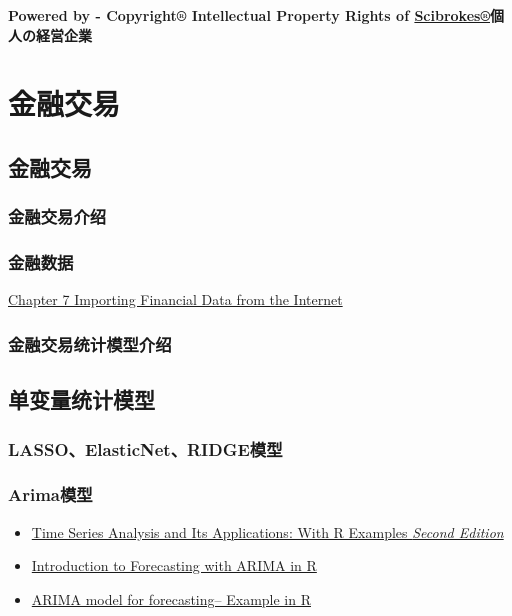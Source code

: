 \documentclass[]{book}
\providecommand{\tightlist}{%
  \setlength{\itemsep}{0pt}\setlength{\parskip}{0pt}}
\begin{document}
\textbf{Powered by - Copyright® Intellectual Property Rights of
\href{http://www.scibrokes.com}{Scibrokes®}個人の経営企業}

\chapter{金融交易}\label{finance}

\section{金融交易}

\subsection{金融交易介绍}

\subsection{金融数据}

\href{https://msperlin.github.io/pafdR/importingInternet.html}{Chapter 7
Importing Financial Data from the Internet}

\subsection{金融交易统计模型介绍}

\section{单变量统计模型}

\subsection{LASSO、ElasticNet、RIDGE模型}\label{lassoelasticnetridge}

\subsection{Arima模型}\label{arima}

\begin{itemize}
\tightlist
\item
  \href{https://www.stat.pitt.edu/stoffer/tsa2/Rissues.htm}{Time Series
  Analysis and Its Applications: With R Examples \emph{Second Edition}}
\item
  \href{https://www.datascience.com/blog/introduction-to-forecasting-with-arima-in-r-learn-data-science-tutorials}{Introduction
  to Forecasting with ARIMA in R}
\item
  \href{https://rstudio-pubs-static.s3.amazonaws.com/345790_3c1459661736433382863ed19c30ea55.html}{ARIMA
  model for forecasting-- Example in R}
\end{itemize}
\end{document}
